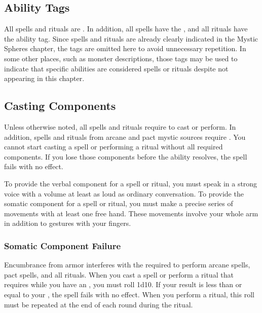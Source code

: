     \subsection{Ability Tags}
        All spells and rituals are \magical.
        In addition, all spells have the  , and all rituals have the  ability tag.
        Since spells and rituals are already clearly indicated in the Mystic Spheres chapter, the tags are omitted here to avoid unnecessary repetition.
        In some other places, such as monster descriptions, those tags may be used to indicate that specific abilities are considered spells or rituals despite not appearing in this chapter.

    \subsection{Casting Components}\label{Casting Components}
        Unless otherwise noted, all spells and rituals require  to cast or perform.
        In addition, spells and rituals from arcane and pact mystic sources require .
        You cannot start casting a spell or performing a ritual without all required components.
        If you lose those components before the ability resolves, the spell fails with no effect.

        To provide the verbal component for a spell or ritual, you must speak in a strong voice with a volume at least as loud as ordinary conversation.
        To provide the somatic component for a spell or ritual, you must make a precise series of movements with at least one free hand.
        These movements involve your whole arm in addition to gestures with your fingers.

        \subsubsection{Somatic Component Failure}\label{Somatic Component Failure}
            Encumbrance from armor interferes with the  required to perform arcane spells, pact spells, and all rituals.
            When you cast a spell or perform a ritual that requires  while you have an , you must roll 1d10.
            If your result is less than or equal to your , the spell fails with no effect.
            When you perform a ritual, this roll must be repeated at the end of each round during the ritual.


